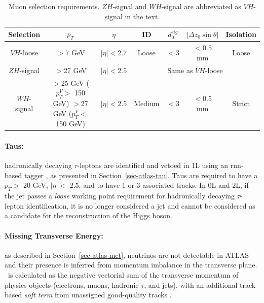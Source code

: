 \begin{table}[!htbp]
    \begin{center}
        \begin{tabular}{ccccccc} \hline \hline
          Selection & $p_T$ & $\eta$ & ID & $d_{0}^{\mathrm sig}$  & $|\Delta{z_{0}}\sin\theta|$ & Isolation \\ \hline
          $VH$-loose & $>$7 GeV & $|\eta|< 2.7$ & Loose & $ <3$ & $<0.5$ mm & Loose \\ %
          $ZH$-signal & $>$27 GeV & $|\eta| < 2.5$ & \multicolumn{4}{c}{Same as $VH$-loose} \\
          $WH$-signal & \makecell[c]{$>$25 GeV ($p_T^V>$ 150 GeV)\\ $>$27 GeV ($p_T^V<$ 150 GeV)} & $|\eta|< 2.5$ & Medium & $ <3$ & $<0.5$ mm & Strict \\
          \hline\hline
        \end{tabular}
      \caption{Muon selection requirements. $ZH$-signal and $WH$-signal are abbreviated as $VH$-signal in the text.} 
      \label{tbl:muonOb}
    \end{center}
  \end{table}
  
\paragraph{Taus:} hadronically decaying $\tau$-leptons are identified and vetoed in 1L using an \gls{rnn}-based tagger \cite{ATL-PHYS-PUB-2019-033}, as presented in Section~\ref{sec-atlas-tau}. Taus are required to have a $p_T >$ 20 GeV, $|\eta| <$ 2.5, and to have 1 or 3 associated tracks. In 0L and 2L, if the jet passes a \textit{loose} working point requirement for hadronically decaying $\tau$-lepton identification, it is no longer considered a jet and cannot be considered as a candidate for the reconstruction of the Higgs boson. 

\paragraph{Missing Transverse Energy:} as described in Section~\ref{sec-atlas-met}, neutrinos are not detectable in ATLAS and their presence is inferred from momentum imbalance in the transverse plane. \etm\ is calculated as the negative vectorial sum of the transverse momentum of physics objects (electrons, muons, hadronic $\tau$, and jets), with an additional track-based \textit{soft term} from unassigned good-quality tracks \cite{ATLASmetReco}. 

